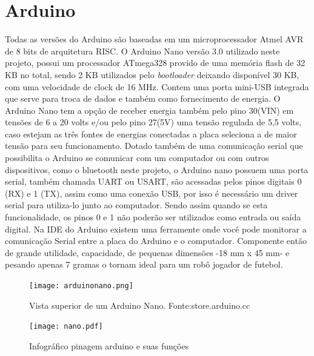 \documentclass[a4paper,12pt,portuguese]{ufms-cpcx}
\begin{document}
\section{Arduino}\label{arduinonano}
Todas as versões do Arduino são baseadas em um microprocessador Atmel AVR de 8 bits de arquitetura RISC\cite{arduinoemacao}. O Arduino Nano versão 3.0 utilizado neste projeto, possui um processador ATmega328 provido de uma memória flash de 32 KB no total, sendo 2 KB utilizados pelo \textit{bootloader} deixando disponível 30 KB, com uma velocidade de clock de 16 MHz. Contem uma porta mini-USB integrada que serve para troca de dados e também como fornecimento de energia. O Arduino Nano tem a opção de receber energia também pelo pino 30(VIN) em tensões de 6 a 20 volts e/ou pelo pino 27(5V) uma tensão regulada de 5,5 volts, caso estejam as três fontes de energias conectadas a placa seleciona a de maior tensão para seu funcionamento. Dotado também de uma comunicação serial que possibilita o Arduino se comunicar com um computador ou com outros dispositivos, como o bluetooth neste projeto, o Arduino nano possuem uma porta serial, também chamada UART ou USART, são acessadas pelos pinos digitais 0 (RX) e 1 (TX), assim como uma conexão USB, por isso é necessário um driver serial para utiliza-lo junto ao computador. Sendo assim quando se esta funcionalidade, os pinos 0 e 1 não poderão ser utilizados como entrada ou saída digital.
Na IDE do Arduino existem uma ferramente onde você pode monitorar a comunicação Serial entre a placa do Arduino e o computador.
Componente então de grande utilidade, capacidade, de pequenas dimensões -18 mm x 45 mm- e pesando apenas 7 gramas o tornam ideal para um robô jogador de futebol. 
\begin{figure}[H]
	\centering
	\texttt{[image: arduinonano.png]}
	\caption{Vista superior de um Arduino Nano. Fonte:store.arduino.cc}
\end{figure}
\begin{figure}[H]
	\centering
	\texttt{[image: nano.pdf]}
	\caption{Infográfico pinagem arduino e suas funções}
\end{figure}
\end{document}

